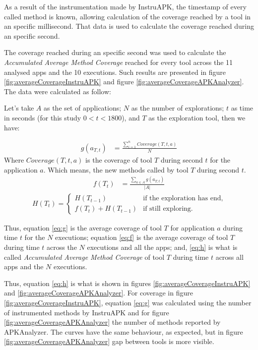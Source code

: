 As a result of the instrumentation made by InstruAPK, the timestamp of every called method is known, allowing calculation of the coverage reached by a tool in an specific millisecond. That data is used to calculate the coverage reached during an specific second. 

The coverage reached during an specific second was used to calculate the \textit{Accumulated Average Method Coverage} reached for every tool across the 11 analysed apps and the 10 executions. Such results are presented in figure \ref{fig:averageCoverageInstruAPK} and figure \ref{fig:averageCoverageAPKAnalyzer}. The data were calculated as follow:

Let's take $A$ as the set of applications; $N$ as the number of explorations; $t$ as time in seconds (for this study $0<t<1800$), and $T$ as the exploration tool, then we have:

\begin{align}
  g(a_{T,t}) &= \frac{\sum_{i=1}^{n} Coverage(T,t,a)}{N}\label{eq:g} 
\end{align}
Where $Coverage(T,t,a)$ is the coverage of tool $T$ during second $t$ for the application $a$. Which means, the new methods called by tool $T$ during second $t$.
\begin{align}
f(T_t) &= \frac{\sum_{a \in A} g(a_{T,t})}{|A|} \label{eq:f}
\end{align}
\begin{align}
H(T_t)=\begin{cases}
		H(T_{t-1})& \text{if the exploration has end},\\ 
		f(T_t)+H(T_{t-1})& \text{if still exploring}. \label{eq:h}
	\end{cases}
\end{align}

Thus, equation \ref{eq:g} is the average coverage of tool $T$ for application $a$ during time $t$ for the $N$ executions; equation \ref{eq:f} is the average coverage of tool $T$ during time $t$ across the $N$ executions and all the apps; and, \ref{eq:h} is what is called \textit{Accumulated Average Method Coverage} of tool $T$ during time $t$ across all apps and the $N$ executions. 


Thus, equation \ref{eq:h} is what is shown in figures \ref{fig:averageCoverageInstruAPK} and \ref{fig:averageCoverageAPKAnalyzer}. For coverage in figure \ref{fig:averageCoverageInstruAPK}, equation \ref{eq:g} was calculated using the number of instrumented methods by InstruAPK and for figure \ref{fig:averageCoverageAPKAnalyzer} the number of methods reported by APKAnalyzer. The curves have the same behaviour, as expected, but in figure \ref{fig:averageCoverageAPKAnalyzer} gap between tools is more visible.

